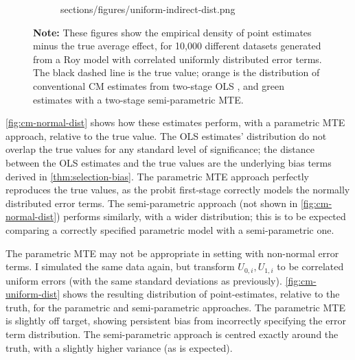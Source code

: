 \begin{figure}[h!]
\begin{subfigure}[c]{0.475\textwidth}
{            sections/figures/uniform-indirect-dist.png}
    \end{subfigure}
    \label{fig:cm-uniform-dist}
    \justify
    \footnotesize    
    \textbf{Note:}
    These figures show the empirical density of point estimates minus the true average effect, for 10,000 different datasets generated from a Roy model with correlated uniformly distributed error terms.
    The black dashed line is the true value;
    orange is the distribution of conventional CM estimates from two-stage OLS \citep{imai2010identification},
    and green estimates with a two-stage semi-parametric MTE.
\end{figure}

\autoref{fig:cm-normal-dist} shows how these estimates perform, with a parametric MTE approach, relative to the true value.
The OLS estimates' distribution do not overlap the true values for any standard level of significance; the distance between the OLS estimates and the true values are the underlying bias terms derived in \autoref{thm:selection-bias}.
The parametric MTE approach perfectly reproduces the true values, as the probit first-stage correctly models the normally distributed error terms.
The semi-parametric approach (not shown in \autoref{fig:cm-normal-dist}) performs similarly, with a wider distribution; this is to be expected comparing a correctly specified parametric model with a semi-parametric one.

The parametric MTE may not be appropriate in setting with non-normal error terms.
I simulated the same data again, but transform $U_{0,i}, U_{1,i}$ to be correlated uniform errors (with the same standard deviations as previously).
\autoref{fig:cm-uniform-dist} shows the resulting distribution of point-estimates, relative to the truth, for the parametric and semi-parametric approaches.
The parametric MTE is slightly off target, showing persistent bias from incorrectly specifying the error term distribution.
The semi-parametric approach is centred exactly around the truth, with a slightly higher variance (as is expected).

